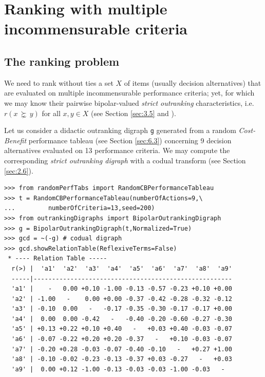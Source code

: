 \chapter{Ranking with multiple incommensurable criteria}
\label{sec:8}



\section{The ranking problem}
\label{sec:8.1}

We need to rank without ties a set $X$ of items (usually decision alternatives) that are evaluated on multiple incommensurable performance criteria; yet, for which we may know their pairwise bipolar-valued {\em strict outranking\/} characteristics, i.e. $r(x\, \succnsim \, y)$ for all $x, y \in X$ (see Section \ref{sec:3.5} and \citep{BIS-2013}).

Let us consider a didactic outranking digraph \texttt{g} generated from a random \emph{Cost-Benefit} performance tableau (see Section \ref{sec:6.3}) concerning 9 decision alternatives evaluated on 13 performance criteria. We may compute the corresponding {\em strict outranking digraph\/} with a codual transform (see Section \ref{sec:2.6}).

\begin{lstlisting}[caption={Random bipolar-valued strict outranking relation characteristics},label=list:8.1]
>>> from randomPerfTabs import RandomCBPerformanceTableau   
>>> t = RandomCBPerformanceTableau(numberOfActions=9,\
...         numberOfCriteria=13,seed=200)
>>> from outrankingDigraphs import BipolarOutrankingDigraph
>>> g = BipolarOutrankingDigraph(t,Normalized=True)
>>> gcd = ~(-g) # codual digraph
>>> gcd.showRelationTable(ReflexiveTerms=False)
 * ---- Relation Table -----
  r(>) |  'a1'  'a2'  'a3'  'a4'  'a5'  'a6'  'a7'  'a8'  'a9'   
  -----|------------------------------------------------------
  'a1' |    -   0.00 +0.10 -1.00 -0.13 -0.57 -0.23 +0.10 +0.00  
  'a2' | -1.00   -    0.00 +0.00 -0.37 -0.42 -0.28 -0.32 -0.12  
  'a3' | -0.10  0.00   -   -0.17 -0.35 -0.30 -0.17 -0.17 +0.00  
  'a4' |  0.00  0.00 -0.42   -   -0.40 -0.20 -0.60 -0.27 -0.30  
  'a5' | +0.13 +0.22 +0.10 +0.40   -   +0.03 +0.40 -0.03 -0.07  
  'a6' | -0.07 -0.22 +0.20 +0.20 -0.37   -   +0.10 -0.03 -0.07  
  'a7' | -0.20 +0.28 -0.03 -0.07 -0.40 -0.10   -   +0.27 +1.00  
  'a8' | -0.10 -0.02 -0.23 -0.13 -0.37 +0.03 -0.27   -   +0.03  
  'a9' |  0.00 +0.12 -1.00 -0.13 -0.03 -0.03 -1.00 -0.03   -   
\end{lstlisting}
  
